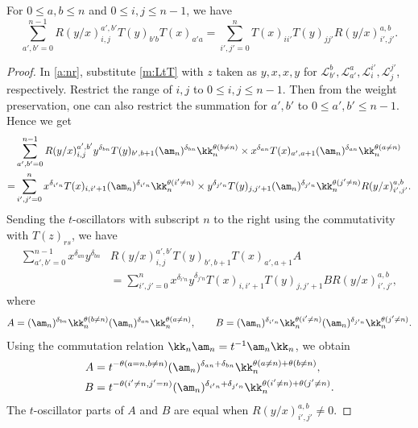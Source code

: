 \begin{prop}[Rank-reducing $RTT=TTR$ relation]\label{a:pr:rr}
For $0 \le a,b \le n$ and $0 \le i,j \le n-1$, we have
\begin{equation}\label{a:rrr}
\sum_{a',b'=0}^{n-1}R(y/x)_{i, j}^{a', b'}T(y)_{b'b}T(x)_{a'a}
=\sum_{i',j'=0}^nT(x)_{ii'}T(y)_{jj'}R(y/x)_{i', j'}^{a, b}.
\end{equation}
\end{prop}

\begin{proof}
In \eqref{a:nr},  
substitute \eqref{m:LtT} with $z$ taken as $y,x,x,y$ for 
$\mathcal{L}_{b'}^b,  \mathcal{L}_{a'}^a, \mathcal{L}_i^{i'}, \mathcal{L}_j^{j'}$, respectively.
Restrict the range of $i,j$ to $0\le i,j\le n-1$. 
Then from the weight preservation, one can also restrict the summation for $a',b'$ to $0\le a',b'\le n-1$.
Hence we get
\begin{align*}
&\sum_{a',b'=0}^{n-1}R(y/x)_{i, j}^{a', b'}y^{\delta_{bn}}T(y)_{b',b+1}(\am_n)^{\delta_{bn}}\kk_n^{\theta(b\ne n)}
\times x^{\delta_{an}}T(x)_{a',a+1}(\am_n)^{\delta_{an}}\kk_n^{\theta(a\ne n)}\\
=&\sum_{i',j'=0}^nx^{\delta_{i'n}}T(x)_{i,i'+1}(\am_n)^{\delta_{i'n}}\kk_n^{\theta(i'\ne n)}
\times y^{\delta_{j'n}}T(y)_{j,j'+1}(\am_n)^{\delta_{j'n}}\kk_n^{\theta(j'\ne n)}R(y/x)_{i', j'}^{a, b}.
\end{align*}
Sending the $t$-oscillators with subscript $n$ to the right using the commutativity  
with $T(z)_{rs}$, we have
\begin{align*}
\sum_{a',b'=0}^{n-1}x^{\delta_{an}}y^{\delta_{bn}} &R(y/x)_{i, j}^{a', b'}T(y)_{b',b+1}T(x)_{a',a+1} A
\\ & =\sum_{i',j'=0}^nx^{\delta_{i'n}}y^{\delta_{j'n}}T(x)_{i,i'+1}T(y)_{j,j'+1} B R(y/x)_{i', j'}^{a, b},
\end{align*}
where 
\[
A=(\am_n)^{\delta_{bn}}\kk_n^{\theta(b\ne n)}(\am_n)^{\delta_{an}}\kk_n^{\theta(a\ne n)},\qquad
B=(\am_n)^{\delta_{i'n}}\kk_n^{\theta(i'\ne n)}(\am_n)^{\delta_{j'n}}\kk_n^{\theta(j'\ne n)}.
\]
Using the commutation relation $\kk_n\am_n=t^{-1}\am_n\kk_n$, we obtain
\begin{align*}
A &=t^{-\theta(a=n,b\ne n)}(\am_n)^{\delta_{an}+\delta_{bn}}\kk_n^{\theta(a\ne n)+\theta(b\ne n)},
\\
B&=t^{-\theta(i'\ne n,j'=n)}(\am_n)^{\delta_{i'n}+\delta_{j'n}}\kk_n^{\theta(i'\ne n)+\theta(j'\ne n)}.
\end{align*}
The $t$-oscillator parts of $A$ and $B$ are equal when $R(y/x)^{a, b}_{i', j'}\ne0$.

\end{proof}
